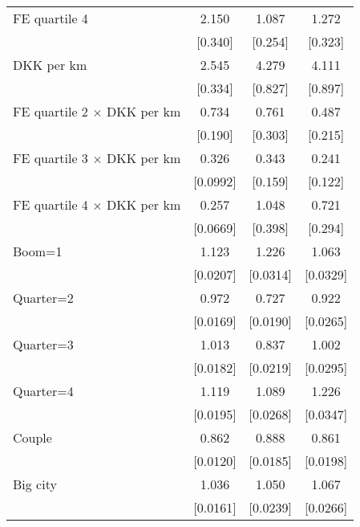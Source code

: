 \begin{longtable}{lccc}
FE quartile 4       &       2.150\sym{***}&       1.087         &       1.272         \tabularnewline
                    &     [0.340]         &     [0.254]         &     [0.323]         \tabularnewline
  
DKK per km          &       2.545\sym{***}&       4.279\sym{***}&       4.111\sym{***}\tabularnewline
                    &     [0.334]         &     [0.827]         &     [0.897]         \tabularnewline
  
FE quartile 2 $\times$ DKK per km&       0.734         &       0.761         &       0.487         \tabularnewline
                    &     [0.190]         &     [0.303]         &     [0.215]         \tabularnewline
  
FE quartile 3 $\times$ DKK per km&       0.326\sym{***}&       0.343\sym{*}  &       0.241\sym{**} \tabularnewline
                    &    [0.0992]         &     [0.159]         &     [0.122]         \tabularnewline
  
FE quartile 4 $\times$ DKK per km&       0.257\sym{***}&       1.048         &       0.721         \tabularnewline
                    &    [0.0669]         &     [0.398]         &     [0.294]         \tabularnewline
  
Boom=1              &       1.123\sym{***}&       1.226\sym{***}&       1.063\sym{*}  \tabularnewline
                    &    [0.0207]         &    [0.0314]         &    [0.0329]         \tabularnewline
  
Quarter=2           &       0.972         &       0.727\sym{***}&       0.922\sym{**} \tabularnewline
                    &    [0.0169]         &    [0.0190]         &    [0.0265]         \tabularnewline
  
Quarter=3           &       1.013         &       0.837\sym{***}&       1.002         \tabularnewline
                    &    [0.0182]         &    [0.0219]         &    [0.0295]         \tabularnewline
  
Quarter=4           &       1.119\sym{***}&       1.089\sym{***}&       1.226\sym{***}\tabularnewline
                    &    [0.0195]         &    [0.0268]         &    [0.0347]         \tabularnewline
  
Couple              &       0.862\sym{***}&       0.888\sym{***}&       0.861\sym{***}\tabularnewline
                    &    [0.0120]         &    [0.0185]         &    [0.0198]         \tabularnewline
  
Big city            &       1.036\sym{*}  &       1.050\sym{*}  &       1.067\sym{**} \tabularnewline
                    &    [0.0161]         &    [0.0239]         &    [0.0266]         \tabularnewline
  

\end{longtable}

